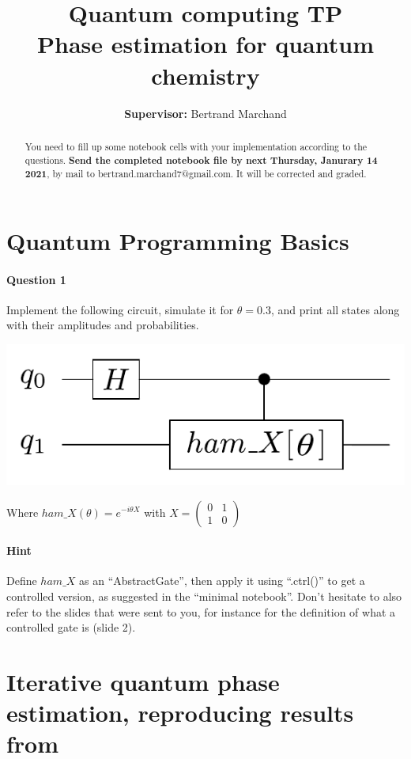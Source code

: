 \documentclass{article}
\title{Quantum computing TP\\ Phase estimation for quantum chemistry}
\author{\textbf{Supervisor:} Bertrand Marchand}
\begin{document}
\maketitle
\begin{abstract}
You need to fill up some notebook cells with your implementation according to the questions.
\textbf{Send the completed notebook file by next Thursday, Janurary 14 2021}, by mail to bertrand.marchand7@gmail.com. 
It will be corrected and graded.
\end{abstract}

\section{Quantum Programming Basics}

\paragraph{Question 1} Implement the following circuit, simulate it for $\theta=0.3$, and print all states along with their amplitudes and probabilities.

\begin{center}
\includegraphics[width=.7\textwidth]{qat2pdf_llce_fji_circ.pdf}
\end{center}

Where $ham\_X(\theta) = e^{-i\theta X}$ with $X=\begin{pmatrix}0 & 1 \\ 1 & 0\end{pmatrix}$

\paragraph{Hint} Define $ham\_X$ as an ``AbstractGate'', then apply it using ``.ctrl()'' to get a controlled version, as suggested in 
the ``minimal notebook''. Don't hesitate to also refer to the slides that were sent to you, for instance for the definition of what
a controlled gate is (slide 2).

\section{Iterative quantum phase estimation, reproducing results from \textcolor{blue}{\cite{o2016scalable}}}
\end{document}
